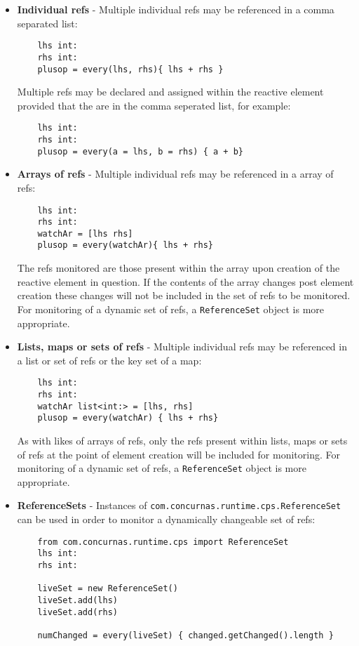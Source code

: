 \documentclass[conc-doc]{subfiles}
\begin{document}
\begin{itemize}
	\item \textbf{Individual refs} - Multiple individual refs may be referenced in a comma separated list:
	\begin{lstlisting}
	lhs int:
	rhs int:
	plusop = every(lhs, rhs){ lhs + rhs	}
	\end{lstlisting}
	Multiple refs may be declared and assigned within the reactive element provided that the are in the comma seperated list, for example:
	\begin{lstlisting}
	lhs int:
	rhs int:
	plusop = every(a = lhs, b = rhs) { a + b}
	\end{lstlisting}	
	\item \textbf{Arrays of refs} - Multiple individual refs may be referenced in a array of refs:
	\begin{lstlisting}
	lhs int:
	rhs int:
	watchAr = [lhs rhs]
	plusop = every(watchAr){ lhs + rhs}
	\end{lstlisting}
	The refs monitored are those present within the array upon creation of the reactive element in question. If the contents of the array changes post element creation these changes will not be included in the set of refs to be monitored. For monitoring of a dynamic set of refs, a \lstinline{ReferenceSet} object is more appropriate.
	\item \textbf{Lists, maps or sets of refs} - Multiple individual refs may be referenced in a list or set of refs or the key set of a map:
	\begin{lstlisting}
	lhs int:
	rhs int:
	watchAr list<int:> = [lhs, rhs]
	plusop = every(watchAr) { lhs + rhs}
	\end{lstlisting}
	As with likes of arrays of refs, only the refs present within lists, maps or sets of refs at the point of element creation will be included for monitoring. For monitoring of a dynamic set of refs, a \lstinline{ReferenceSet} object is more appropriate.	
	\item \textbf{ReferenceSets} - Instances of \lstinline{com.concurnas.runtime.cps.ReferenceSet} can be used in order to monitor a dynamically changeable set of refs:
	\begin{lstlisting}
	from com.concurnas.runtime.cps import ReferenceSet
	lhs int:
	rhs int:
	
	liveSet = new ReferenceSet()
	liveSet.add(lhs)
	liveSet.add(rhs)
		
	numChanged = every(liveSet) { changed.getChanged().length }
	

\end{lstlisting}
\end{itemize}
\end{document}
